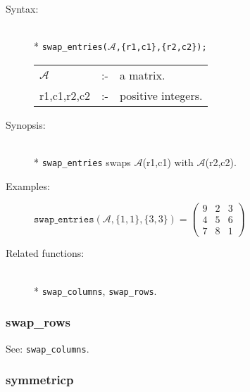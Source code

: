 \begin{description}
\item[Syntax:]\mbox{}\\*
\texttt{swap\_entries($\mathcal{A}$,\{r1,c1\},\{r2,c2\});}\\[2mm]
\begin{tabular}{l l l} 
$\mathcal{A}$  &:-& a matrix. \\
r1,c1,r2,c2 &:-& positive integers.
\end{tabular}

\item[Synopsis:]\mbox{}\\*
\texttt{swap\_entries} swaps $\mathcal{A}$(r1,c1) with 
                $\mathcal{A}$(r2,c2).

\item[Examples:]
\begin{flushleft}  
\begin{math}  
\texttt{swap\_entries}(\mathcal{A},\{1,1\},\{3,3\}) =
        \begin{pmatrix} 9 & 2 & 3 \\ 4 & 5 & 6 \\ 7 & 8 & 1 \end{pmatrix}
\end{math}  
\end{flushleft}

\item[Related functions:]\mbox{}\\*
\texttt{swap\_columns}, \texttt{swap\_rows}.
\end{description}


\subsubsection{swap\_rows}
\label{linalg:swap_rows}
See: \texttt{swap\_columns}.


\subsubsection{symmetricp}
\label{linalg:symmetricp}

